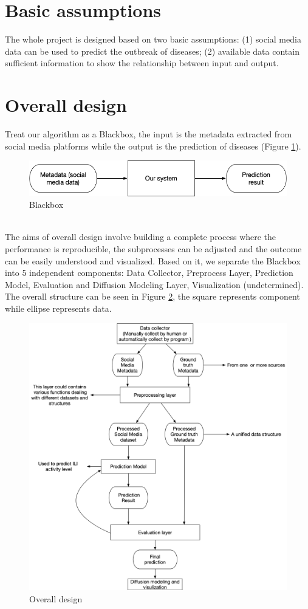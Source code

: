 \section{Basic assumptions}
The whole project is designed based on two basic assumptions: (1) social media data can be used to predict the outbreak of diseases; (2) available data contain sufficient information to show the relationship between input and output.

\section{Overall design}
\label{sec:Overall design}
Treat our algorithm as a Blackbox, the input is the metadata extracted from social media platforms while the output is the prediction of diseases (Figure \ref{fig:sys1}). 
\begin{figure}[!htp]
    \center
    \includegraphics[width=5in]{images/system1.png}
    \caption{Blackbox}
    \label{fig:sys1}
\end{figure}
\\The aims of overall design involve building a complete process where the performance is reproducible, the subprocesses can be adjusted and the outcome can be easily understood and visualized. Based on it, we separate the Blackbox into 5 independent components: Data Collector, Preprocess Layer, Prediction Model, Evaluation and Diffusion Modeling Layer, Visualization (undetermined). The overall structure can be seen in Figure \ref{fig:sys2}, the square represents component while ellipse represents data.
\begin{figure}[!htp]
    \center
    \includegraphics[width=6in]{images/system2.png}
    \caption{Overall design}
    \label{fig:sys2}
\end{figure}
